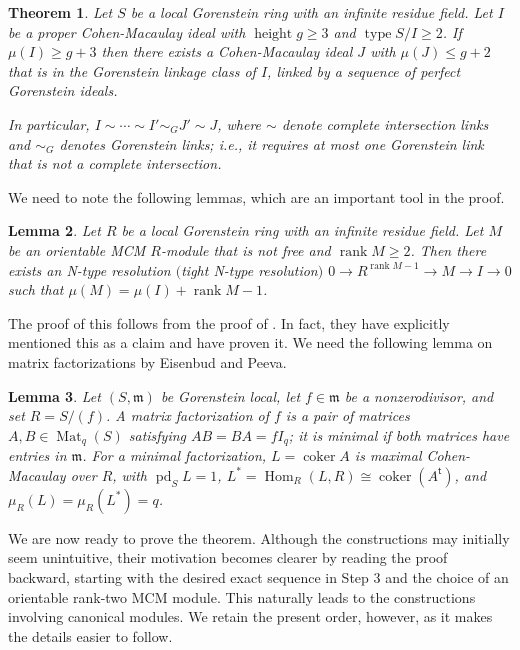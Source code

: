 \documentclass[11pt,letterpaper]{amsart}
\newcommand{\x}{\xrightarrow{}}
\DeclareMathOperator{\type}{type}
\DeclareMathOperator{\rank}{rank}
\DeclareMathOperator{\height}{height}
\theoremstyle{plain}
\newtheorem{thm}{Theorem}[section]
\newtheorem{lem}[thm]{Lemma}
\theoremstyle{definition}
\theoremstyle{remark}
\begin{document}
\begin{thm}\label{reductionofdeviation}
    Let $S$ be a local Gorenstein ring with an infinite residue field. Let $I$ be a proper Cohen-Macaulay ideal with $\height g\ge 3$ and $\type S/I\ge 2$. If $\mu(I)\ge g+3$ then there exists a Cohen-Macaulay ideal $J$ with $\mu(J)\le g+2$ that is in the Gorenstein linkage class of $I$, linked by a sequence
of perfect Gorenstein ideals.

    In particular, $I\sim\cdots\sim I'\sim_GJ'\sim J$, where $\sim$ denote complete intersection links and $\sim_G$ denotes Gorenstein links; i.e., it requires at most one Gorenstein link that is not a complete intersection.   
\end{thm}

We need to note the following lemmas, which are an important tool in the proof. 

\begin{lem}\label{tightbourbaki}
    Let $R$ be a local Gorenstein ring with an infinite residue field. Let $M$ be an orientable MCM $R$-module that is not free and $\rank M\ge 2$. Then there exists an N-type resolution $($\emph{tight N-type resolution}$)$ $0\x R^{\rank M-1}\x M\x I\x 0$ such that $\mu(M)=\mu(I)+\rank M-1$. 
\end{lem}
The proof of this follows from the proof of \cite[Lemma~2.1]{herzog1987maximal}. In fact, they have explicitly mentioned this as a claim and have proven it. We need the following lemma on matrix factorizations by Eisenbud and Peeva. 


\begin{lem}\cite[Theorem~2.1.1]{eisenbud_peeva_2016}\label{matrixfactorizations}
Let $(S,\mathfrak m)$ be Gorenstein local, let $f\in\mathfrak m$ be a nonzerodivisor, and set $R=S/(f)$. A matrix factorization of $f$ is a pair of matrices $A,B\in\operatorname{Mat}_q(S)$ satisfying $AB=BA=fI_q$; it is minimal if both matrices have entries in $\mathfrak m$. For a minimal factorization, $L=\operatorname{coker}A$ is maximal Cohen-Macaulay over $R$, with $\operatorname{pd}_S L=1$, $L^*=\operatorname{Hom}_R(L,R)\cong\operatorname{coker}(A^{\mathsf t})$, and $\mu_R(L)=\mu_R(L^*)=q$.
\end{lem}

We are now ready to prove the theorem. Although the constructions may initially seem unintuitive, their motivation becomes clearer by reading the proof backward, starting with the desired exact sequence in Step 3 and the choice of an orientable rank-two MCM module. This naturally leads to the constructions involving canonical modules. We retain the present order, however, as it makes the details easier to follow.
\end{document}
